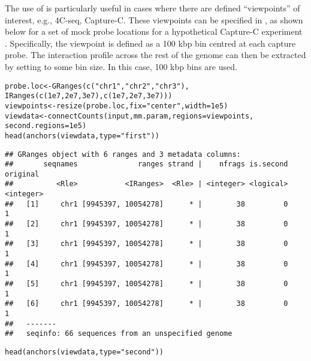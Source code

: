 \documentclass{report}\usepackage[]{graphicx}\usepackage[usenames,dvipsnames]{color}
\newcommand{\hlnum}[1]{\textcolor[rgb]{0.816,0.125,0.439}{#1}}%
\newcommand{\hlstr}[1]{\textcolor[rgb]{0.251,0.627,0.251}{#1}}%
\newcommand{\hlstd}[1]{\textcolor[rgb]{0.251,0.251,0.251}{#1}}%
\newcommand{\hlkwb}[1]{\textcolor[rgb]{0,0,0}{#1}}%
\newcommand{\hlkwc}[1]{\textcolor[rgb]{0.251,0.251,0.251}{#1}}%
\newcommand{\hlkwd}[1]{\textcolor[rgb]{0.878,0.439,0.125}{#1}}%
\newenvironment{knitrout}{}{} %
\begin{document}
The use of  is particularly useful in cases where there are defined ``viewpoints'' of interest, e.g., 4C-seq, Capture-C.
These viewpoints can be specified in , as shown below for a set of mock probe locations for a hypothetical Capture-C experiment \cite{hughes2014analysis}.
Specifically, the viewpoint is defined as a 100 kbp bin centred at each capture probe.
The interaction profile across the rest of the genome can then be extracted by setting  to some bin size.
In this case, 100 kbp bins are used.

\begin{knitrout}
\color{fgcolor}\begin{kframe}
\begin{alltt}
\hlstd{probe.loc} \hlkwb{<-} \hlkwd{GRanges}\hlstd{(}\hlkwd{c}\hlstd{(}\hlstr{"chr1"}\hlstd{,} \hlstr{"chr2"}\hlstd{,} \hlstr{"chr3"}\hlstd{),}
                     \hlkwd{IRanges}\hlstd{(}\hlkwd{c}\hlstd{(}\hlnum{1e7}\hlstd{,} \hlnum{2e7}\hlstd{,} \hlnum{3e7}\hlstd{),} \hlkwd{c}\hlstd{(}\hlnum{1e7}\hlstd{,} \hlnum{2e7}\hlstd{,} \hlnum{3e7}\hlstd{)))}
\hlstd{viewpoints} \hlkwb{<-} \hlkwd{resize}\hlstd{(probe.loc,} \hlkwc{fix}\hlstd{=}\hlstr{"center"}\hlstd{,} \hlkwc{width}\hlstd{=}\hlnum{1e5}\hlstd{)}
\hlstd{viewdata} \hlkwb{<-} \hlkwd{connectCounts}\hlstd{(input, mm.param,} \hlkwc{regions}\hlstd{=viewpoints,}
                          \hlkwc{second.regions}\hlstd{=}\hlnum{1e5}\hlstd{)}
\hlkwd{head}\hlstd{(}\hlkwd{anchors}\hlstd{(viewdata,} \hlkwc{type}\hlstd{=}\hlstr{"first"}\hlstd{))}
\end{alltt}
\begin{verbatim}
## GRanges object with 6 ranges and 3 metadata columns:
##       seqnames              ranges strand |    nfrags is.second  original
##          <Rle>           <IRanges>  <Rle> | <integer> <logical> <integer>
##   [1]     chr1 [9945397, 10054278]      * |        38         0         1
##   [2]     chr1 [9945397, 10054278]      * |        38         0         1
##   [3]     chr1 [9945397, 10054278]      * |        38         0         1
##   [4]     chr1 [9945397, 10054278]      * |        38         0         1
##   [5]     chr1 [9945397, 10054278]      * |        38         0         1
##   [6]     chr1 [9945397, 10054278]      * |        38         0         1
##   -------
##   seqinfo: 66 sequences from an unspecified genome
\end{verbatim}
\begin{alltt}
\hlkwd{head}\hlstd{(}\hlkwd{anchors}\hlstd{(viewdata,} \hlkwc{type}\hlstd{=}\hlstr{"second"}\hlstd{))}

\end{alltt}
\end{kframe}
\end{knitrout}
\end{document}
